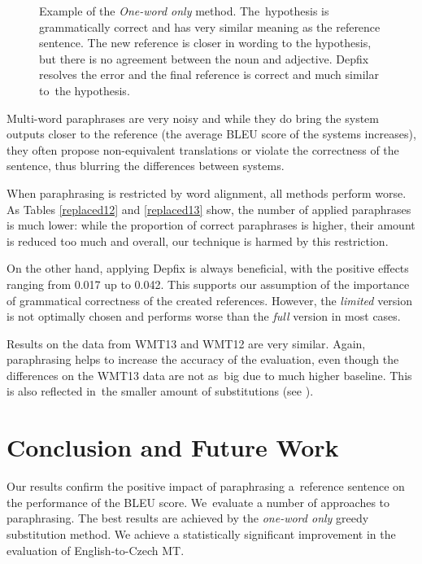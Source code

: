 \begin{figure}[t]
\begin{center}
\begin{tabular}{ll}
\end{tabular}
\caption{Example of the \textit{One-word only} method. The~hypothesis is grammatically 
correct and has very similar meaning as the reference sentence. The new reference is closer 
in wording to the hypothesis, but there is no agreement between the noun and adjective. 
Depfix resolves the error and the final reference is correct and much similar to~the hypothesis.}
\label{example}
\end{center}
\end{figure}

Multi-word paraphrases are very noisy and while they do bring the system outputs closer to the 
reference (the average BLEU score of the systems increases), they often propose non-equivalent 
translations or violate the correctness of the sentence, thus blurring the differences between 
systems.

When paraphrasing is restricted by word alignment, all methods perform worse. As
Tables \ref{replaced12} 
and \ref{replaced13} show, the number of applied paraphrases is much lower: while the proportion of correct 
paraphrases is higher, their amount is reduced too much and overall, our technique is harmed by 
this restriction. 

On the other hand, applying Depfix is always beneficial, with the positive effects ranging 
from 0.017 up to 0.042. This supports our assumption of the importance of grammatical correctness 
of the created references. However, the \textit{limited} version is not optimally chosen and
performs worse than the \textit{full} version in most cases.

Results on the data from WMT13 and WMT12 are very similar. Again, paraphrasing helps to increase
the accuracy of the evaluation, even though the differences on the WMT13 data are not as~big due 
to much higher baseline. This is also reflected in~the smaller amount of substitutions (see ).

\section{Conclusion and Future Work}
Our results confirm the positive impact of paraphrasing a~reference sentence on the
performance of the BLEU score. We~evaluate a number of approaches to paraphrasing.
The best results are achieved by the \textit{one-word only} greedy substitution method.
We achieve a statistically significant improvement in the evaluation of 
English-to-Czech MT. 

